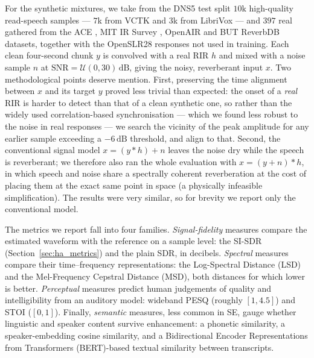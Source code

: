 For the synthetic mixtures, we take from the \acrshort{DNS}5 test split $10$k
high-quality read-speech samples --- $7$k from VCTK \citep{veaux2017cstr} and $3$k
from LibriVox \citep{panayotov2015librispeech} --- and $397$ real 
gathered from the ACE \citep{eaton2015ace}, MIT IR Survey
\citep{traer2016statistics}, OpenAIR \citep{murphy2010openair} and BUT ReverbDB
\citep{szoke2019building} datasets, together with the OpenSLR28
\citep{ko2017study} responses not used in training. Each clean four-second chunk
$y$ is convolved with a real \acrshort{RIR} $h$ and mixed with a noise sample
$n$ at $\mathrm{SNR} = \mathcal{U}(0, 30)\,\text{dB}$, giving the noisy,
reverberant input $x$. Two methodological points deserve mention. First, preserving the time alignment
between $x$ and its target $y$ proved less trivial than expected: the onset of a
\emph{real} \acrshort{RIR} is harder to detect than that of a clean synthetic
one, so rather than the widely used correlation-based synchronisation --- which
we found less robust to the noise in real responses --- we search the vicinity
of the peak amplitude for any earlier sample exceeding a $-6\,\text{dB}$
threshold, and align to that. Second, the conventional signal model
$x = (y * h) + n$ leaves the noise dry while the speech is reverberant; we
therefore also ran the whole evaluation with $x = (y + n) * h$, in which speech
and noise share a spectrally coherent reverberation at the cost of placing them
at the exact same point in space (a physically infeasible simplification). The
results were very similar, so for brevity we report only the conventional model.

The metrics we report fall into four families. \emph{Signal-fidelity} measures
compare the estimated waveform with the reference on a sample level: the
\acrfull{SI-SDR} (Section~\ref{sec:ha_metrics}) and the plain \acrfull{SDR}, in
decibels. \emph{Spectral} measures compare their time--frequency
representations: the Log-Spectral Distance (LSD) and the Mel-Frequency Cepstral Distance (MSD), both distances for
which lower is better. \emph{Perceptual} measures predict human judgements of
quality and intelligibility from an auditory model: wideband \acrfull{PESQ}
(roughly $[1, 4.5]$) and \acrfull{STOI} ($[0, 1]$). Finally, \emph{semantic}
measures, less common in \acrshort{SE}, gauge whether linguistic and speaker
content survive enhancement: a phonetic similarity, a speaker-embedding cosine
similarity, and a Bidirectional Encoder Representations from Transformers (BERT)-based textual similarity between transcripts.

